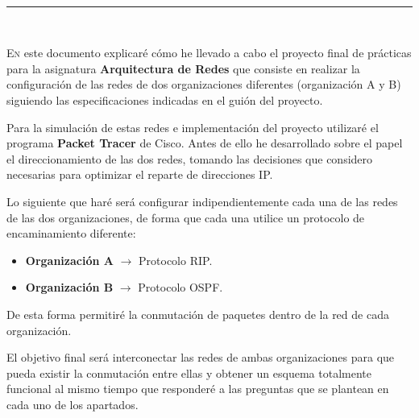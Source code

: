 
\begin{center}
	{\fboxrule=4pt } \\
	\rule{15cm}{0pt} \\
\end{center}

 
 \lettrine[lines=3, depth = 0]{E}{n} este documento explicar\'e c\'omo he llevado a cabo el proyecto final de prácticas para la asignatura \textbf{Arquitectura de Redes} que consiste en realizar la configuraci\'on de las redes de dos organizaciones diferentes (organizaci\'on A y B) siguiendo las especificaciones indicadas en el gui\'on del proyecto.
 
\par Para la simulación de estas redes e implementación del proyecto utilizaré el programa \textbf{Packet Tracer} de Cisco. Antes de ello he desarrollado sobre el papel el direccionamiento de las dos redes, tomando las decisiones que considero necesarias para optimizar el reparte de direcciones IP.
\par Lo siguiente que haré será configurar indipendientemente cada una de las redes de las dos organizaciones, de forma que cada una utilice un protocolo de encaminamiento diferente: 
 \begin{itemize}
 	\item \textbf{Organización A} $\rightarrow$ Protocolo RIP.
	\item \textbf{Organización B} $\rightarrow$ Protocolo OSPF.
 \end{itemize}
\par De esta forma permitiré la conmutación de paquetes dentro de la red de cada organización.
\par El objetivo final será interconectar las redes de ambas organizaciones para que pueda existir la conmutación entre ellas y obtener un esquema totalmente funcional al mismo tiempo que responderé a las preguntas que se plantean en cada uno de los apartados.
 

\newpage
{}
